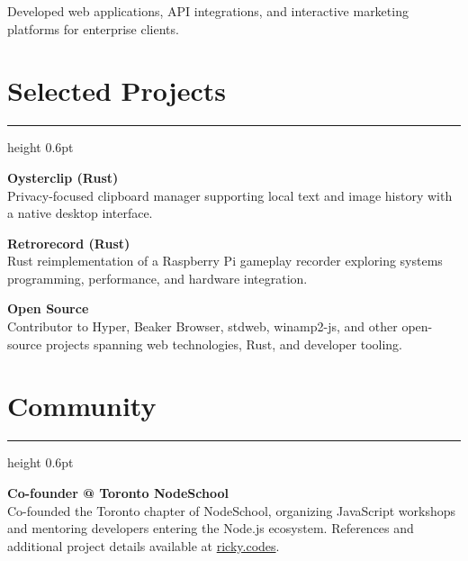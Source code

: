 \documentclass[10pt,letterpaper]{article}
\newcommand{\headingfont}{\plexmono}
\newcommand{\sectionrule}{\vspace{1pt}\color{rule}\hrule height 0.6pt\color{ink}\vspace{5pt}}
\begin{document}
Developed web applications, API integrations, and interactive marketing platforms for enterprise clients.

\section{Selected Projects}

\sectionrule

{\headingfont\bfseries Oysterclip (Rust)}\\[-1pt]
Privacy-focused clipboard manager supporting local text and image history with a native desktop interface.

\vspace{5pt}

{\headingfont\bfseries Retrorecord (Rust)}\\[-1pt]
Rust reimplementation of a Raspberry Pi gameplay recorder exploring systems programming, performance, and hardware integration.

\vspace{5pt}

{\headingfont\bfseries Open Source}\\[-1pt]
Contributor to Hyper, Beaker Browser, stdweb, winamp2-js, and other open-source projects spanning web technologies, Rust, and developer tooling.

\section{Community}

\sectionrule

{\headingfont\bfseries Co-founder \textcolor{muted}{@} \textcolor{tealink}{Toronto NodeSchool}}\\[-1pt]
Co-founded the Toronto chapter of NodeSchool, organizing JavaScript workshops and mentoring developers entering the Node.js ecosystem.
\vfill
{\headingfont\small\color{muted} References and additional project details available at \href{https://ricky.codes}{ricky.codes}.}
\end{document}
